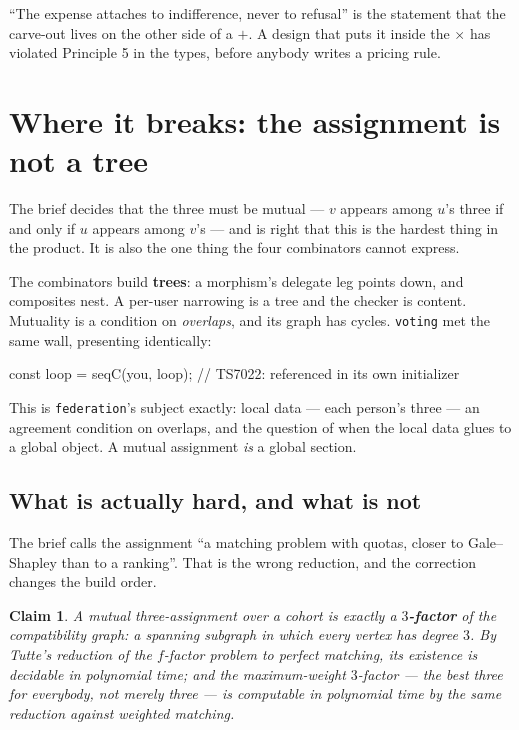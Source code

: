 \documentclass[11pt,a4paper]{article}
\newtheorem*{claim}{Claim}
\begin{document}
\begin{sectionbox}
``The expense attaches to indifference, never to refusal'' is the statement that
the carve-out lives on the other side of a $+$. A design that puts it inside the
$\times$ has violated Principle 5 in the types, before anybody writes a pricing
rule.
\end{sectionbox}

\section{Where it breaks: the assignment is not a tree}

The brief decides that the three must be mutual --- $v$ appears among $u$'s three
if and only if $u$ appears among $v$'s --- and is right that this is the hardest
thing in the product. It is also the one thing the four combinators cannot
express.

The combinators build \textbf{trees}: a morphism's delegate leg points down, and
composites nest. A per-user narrowing is a tree and the checker is content.
Mutuality is a condition on \emph{overlaps}, and its graph has cycles.
\texttt{voting} met the same wall, presenting identically:

\begin{term}
const loop = seqC(you, loop);   // TS7022: referenced in its own initializer
\end{term}

This is \texttt{federation}'s subject exactly: local data --- each person's three
--- an agreement condition on overlaps, and the question of when the local data
glues to a global object. A mutual assignment \emph{is} a global section.

\subsection{What is actually hard, and what is not}

The brief calls the assignment ``a matching problem with quotas, closer to
Gale--Shapley than to a ranking''. That is the wrong reduction, and the
correction changes the build order.

\begin{claim}
A mutual three-assignment over a cohort is exactly a \textbf{$3$-factor} of the
compatibility graph: a spanning subgraph in which every vertex has degree $3$.
By Tutte's reduction of the $f$-factor problem to perfect matching, its existence
is decidable in polynomial time; and the \emph{maximum-weight} $3$-factor --- the
best three for everybody, not merely three --- is computable in polynomial time
by the same reduction against weighted matching.
\end{claim}
\end{document}
